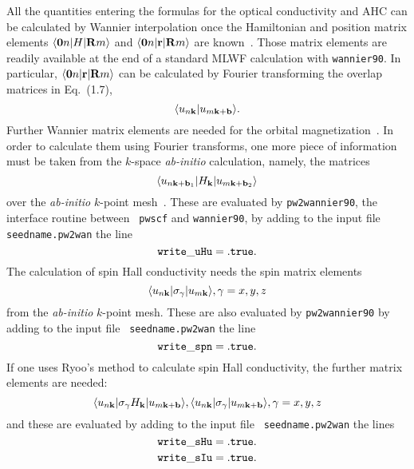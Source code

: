 All the quantities entering the formulas for the optical conductivity
and AHC can be calculated by Wannier interpolation once the
Hamiltonian and position matrix elements $\langle {\bf 0}n\vert H\vert
{\bf R}m\rangle$ and $\langle {\bf 0}n\vert {\bf r}\vert {\bf
  R}m\rangle$ are known~\cite{wang-prb06,yates-prb07}.  Those matrix
elements are readily available at the end of a standard MLWF
calculation with {\tt wannier90}. In particular, $\langle {\bf
  0}n\vert {\bf r}\vert {\bf R}m\rangle$ can be calculated by Fourier
transforming the overlap matrices in Eq.~(1.7),
%
$$\langle u_{n{\bf k}}\vert u_{m{\bf k}+{\bf b}}\rangle.
$$
%
Further Wannier matrix elements are needed for the orbital
magnetization~\cite{lopez-prb12}. In order to calculate them using
Fourier transforms, one more piece of information must be taken from
the $k$-space {\it ab-initio} calculation, namely, the matrices
%
$$\langle u_{n{\bf k}+{\bf b}_1}\vert
H_{\bf k}\vert u_{m{\bf k}+{\bf b}_2}\rangle
$$
%
over the {\it ab-initio} $k$-point mesh~\cite{lopez-prb12}.  These are
evaluated by {\tt pw2wannier90}, the interface routine between {\tt
  pwscf} and {\tt wannier90}, by adding to the input file {\tt
  seedname.pw2wan} the line
%
$${\tt
write\_uHu = .true.
}
$$
The calculation of spin Hall conductivity needs the 
spin matrix elements
%
$$\langle u_{n{\bf k}}\vert \sigma_\gamma \vert u_{m{\bf k}}\rangle, 
\gamma = x, y, z
$$
% 
from the {\it ab-initio} $k$-point mesh. These are also 
evaluated by {\tt pw2wannier90} by adding to the input file {\tt
seedname.pw2wan} the line
%
$${\tt
	write\_spn = .true.
}
$$
If one uses Ryoo's method to calculate spin Hall conductivity, the further matrix elements are needed:
%
$$\langle u_{n{\bf k}}\vert
\sigma_\gamma H_{\bf k}\vert u_{m{\bf k}+{\bf b}}\rangle, \langle u_{n{\bf k}}\vert
\sigma_\gamma \vert u_{m{\bf k}+{\bf b}}\rangle,
\gamma = x, y, z
$$
%
and these are evaluated by adding to the input file {\tt
seedname.pw2wan} the lines
%
$${\tt
	write\_sHu = .true.
}
$$
$$
{\tt
	write\_sIu = .true.
}
$$


